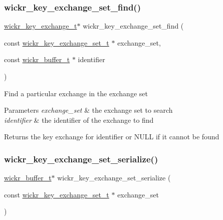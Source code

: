 \subsubsection{\texorpdfstring{wickr\+\_\+key\+\_\+exchange\+\_\+set\+\_\+find()}{wickr\_key\_exchange\_set\_find()}}
{\footnotesize\ttfamily \mbox{\hyperlink{structwickr__key__exchange}{wickr\+\_\+key\+\_\+exchange\+\_\+t}}$\ast$ wickr\+\_\+key\+\_\+exchange\+\_\+set\+\_\+find (\begin{DoxyParamCaption}\item[{const \mbox{\hyperlink{structwickr__key__exchange__set}{wickr\+\_\+key\+\_\+exchange\+\_\+set\+\_\+t}} $\ast$}]{exchange\+\_\+set,  }\item[{const \mbox{\hyperlink{structwickr__buffer}{wickr\+\_\+buffer\+\_\+t}} $\ast$}]{identifier }\end{DoxyParamCaption})}

Find a particular exchange in the exchange set


\begin{DoxyParams}{Parameters}
{\em exchange\+\_\+set} & the exchange set to search \\
\hline
{\em identifier} & the identifier of the exchange to find \\
\hline
\end{DoxyParams}
\begin{DoxyReturn}{Returns}
the key exchange for \textquotesingle{}identifier\textquotesingle{} or N\+U\+LL if it cannot be found 
\end{DoxyReturn}
\mbox{\label{group__wickr__key__exchange__set_gaf31dcf7493d3eccd4b31b0ff2a79f536}} 
\subsubsection{\texorpdfstring{wickr\+\_\+key\+\_\+exchange\+\_\+set\+\_\+serialize()}{wickr\_key\_exchange\_set\_serialize()}}
{\footnotesize\ttfamily \mbox{\hyperlink{structwickr__buffer}{wickr\+\_\+buffer\+\_\+t}}$\ast$ wickr\+\_\+key\+\_\+exchange\+\_\+set\+\_\+serialize (\begin{DoxyParamCaption}\item[{const \mbox{\hyperlink{structwickr__key__exchange__set}{wickr\+\_\+key\+\_\+exchange\+\_\+set\+\_\+t}} $\ast$}]{exchange\+\_\+set }\end{DoxyParamCaption})}

